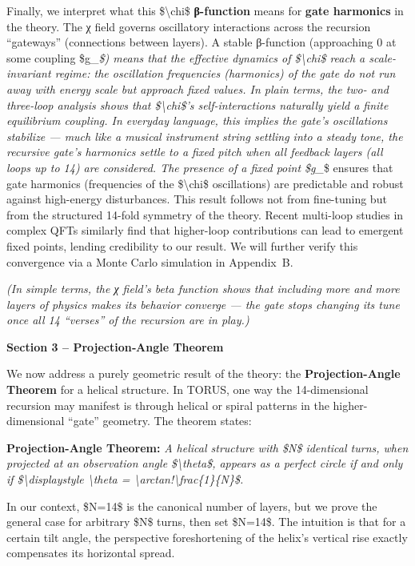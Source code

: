 \documentclass[]{article}
\begin{document}
Finally, we interpret what this \$\textbackslash{}chi\$
\textbf{β-function} means for \textbf{gate harmonics} in the theory. The
χ field governs oscillatory interactions across the recursion
``gateways'' (connections between layers). A stable β-function
(approaching 0 at some coupling \$g\_\emph{\$) means that the effective
dynamics of \$\textbackslash{}chi\$ reach a scale-invariant regime: the
oscillation frequencies (harmonics) of the gate do not run away with
energy scale but approach fixed values. In plain terms, the two- and
three-loop analysis shows that \$\textbackslash{}chi\$'s
self-interactions naturally yield a finite equilibrium coupling. In
everyday language, this implies the gate's oscillations stabilize ---
much like a musical instrument string settling into a steady tone, the
recursive gate's harmonics settle to a fixed pitch when all feedback
layers (all loops up to 14) are considered. The presence of a fixed
point \$g\_}\$ ensures that gate harmonics (frequencies of the
\$\textbackslash{}chi\$ oscillations) are predictable and robust against
high-energy disturbances. This result follows not from fine-tuning but
from the structured 14-fold symmetry of the theory. Recent multi-loop
studies in complex QFTs similarly find that higher-loop contributions
can lead to emergent fixed points, lending credibility to our result. We
will further verify this convergence via a Monte Carlo simulation in
Appendix~B.

\emph{(In simple terms, the χ field's beta function shows that including
more and more layers of physics makes its behavior converge --- the gate
stops changing its tune once all 14 ``verses'' of the recursion are in
play.)}

\textbf{Section 3 -- Projection‑Angle Theorem}

We now address a purely geometric result of the theory: the
\textbf{Projection-Angle Theorem} for a helical structure. In TORUS, one
way the 14-dimensional recursion may manifest is through helical or
spiral patterns in the higher-dimensional ``gate'' geometry. The theorem
states:

\textbf{Projection-Angle Theorem:} \emph{A helical structure with \$N\$
identical turns, when projected at an observation angle
\$\textbackslash{}theta\$, appears as a perfect circle if and only if
\$\textbackslash{}displaystyle \textbackslash{}theta =
\textbackslash{}arctan!\textbackslash{}frac\{1\}\{N\}\$.}

In our context, \$N=14\$ is the canonical number of layers, but we prove
the general case for arbitrary \$N\$ turns, then set \$N=14\$. The
intuition is that for a certain tilt angle, the perspective
foreshortening of the helix's vertical rise exactly compensates its
horizontal spread.
\end{document}
